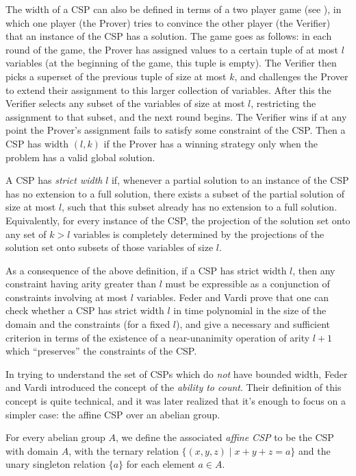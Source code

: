The width of a CSP can also be defined in terms of a two player game (see \cite{pebble-game-width}), in which one player (the Prover) tries to convince the other player (the Verifier) that an instance of the CSP has a solution. The game goes as follows: in each round of the game, the Prover has assigned values to a certain tuple of at most $l$ variables (at the beginning of the game, this tuple is empty). The Verifier then picks a superset of the previous tuple of size at most $k$, and challenges the Prover to extend their assignment to this larger collection of variables. After this the Verifier selects any subset of the variables of size at most $l$, restricting the assignment to that subset, and the next round begins. The Verifier wins if at any point the Prover's assignment fails to satisfy some constraint of the CSP. Then a CSP has width $(l,k)$ if the Prover has a winning strategy only when the problem has a valid global solution.

\begin{defn} A CSP has \emph{strict width} $l$ if, whenever a partial solution to an instance of the CSP has no extension to a full solution, there exists a subset of the partial solution of size at most $l$, such that this subset already has no extension to a full solution. Equivalently, for every instance of the CSP, the projection of the solution set onto any set of $k > l$ variables is completely determined by the projections of the solution set onto subsets of those variables of size $l$.
\end{defn}

As a consequence of the above definition, if a CSP has strict width $l$, then any constraint having arity greater than $l$ must be expressible as a conjunction of constraints involving at most $l$ variables. Feder and Vardi \cite{feder-vardi} prove that one can check whether a CSP has strict width $l$ in time polynomial in the size of the domain and the constraints (for a fixed $l$), and give a necessary and sufficient criterion in terms of the existence of a near-unanimity operation of arity $l+1$ which ``preserves'' the constraints of the CSP.

In trying to understand the set of CSPs which do \emph{not} have bounded width, Feder and Vardi \cite{feder-vardi} introduced the concept of the \emph{ability to count}. Their definition of this concept is quite technical, and it was later realized that it's enough to focus on a simpler case: the affine CSP over an abelian group.

\begin{defn} For every abelian group $A$, we define the associated \emph{affine CSP} to be the CSP with domain $A$, with the ternary relation $\{(x,y,z) \mid x+y+z = a\}$ and the unary singleton relation $\{a\}$ for each element $a \in A$.
\end{defn}

